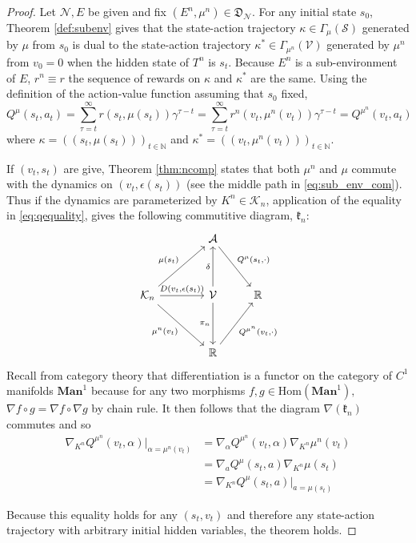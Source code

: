 \documentclass{article} %
\numberwithin{equation}{subsection}
\numberwithin{theorem}{subsection}
\theoremstyle{named}
\def\scriptv{{\mathcal V}}
\def\scripta{{\mathcal A}}
\def\scriptn{{\mathcal N}}
\def\scriptk{{\mathcal K}}
\def\scripts{{\mathcal S}}
\begin{document}
\begin{proof}
  Let $\scriptn, E$ be given and fix $(E^n, \mu^n) \in \mathfrak{D}_\scriptn$.
  For any initial state $s_0$, Theorem  \ref{def:subenv} gives that the state-action trajectory $\kappa \in \Gamma_\mu(\scripts)$ generated by $\mu$ from $s_0$ is dual to the state-action trajectory $\kappa^* \in \Gamma_{\mu^n}(\scriptv)$ generated by $\mu^n$ from $v_0 = 0$ when the hidden state of $T^n$ is $s_t$. Because $E^n$ is a sub-environment of $E$, $r^n \equiv r$ the sequence of rewards on $\kappa$ and $\kappa^*$ are the same. Using the definition of the action-value function assuming that $s_0$ fixed, 
  \begin{equation}\label{eq:qequality}
      Q^{\mu}(s_t, a_t) = \sum_{\tau =t}^\infty r(s_t, \mu(s_t)) \gamma^{\tau - t} = \sum_{\tau =t}^\infty r^n(v_t, \mu^n(v_t)) \gamma^{\tau - t} = Q^{\mu^n}(v_t, a_t)
  \end{equation}
  where $\kappa = ((s_t, \mu(s_t)))_{t\in\mathbb{N}}$ and $\kappa^* = ((v_t,\mu^n(v_t)))_{t\in\mathbb{N}}.$ 


  
If $(v_t, s_t)$ are give, Theorem \ref{thm:ncomp} states that both $\mu^n$ and $\mu$ commute with the dynamics on $(v_t, \epsilon(s_t))$ (see the middle path in \eqref{eq:sub_env_com}). Thus if the dynamics are parameterized by $K^n \in \scriptk_n$, application of the equality in \eqref{eq:qequality}, gives the following commutitive diagram, $\mathfrak{k}_n$:
  \begin{equation}\label{eq:kparam}
    \begin{tikzcd}
    &[+15pt] \scripta \arrow{rd}{Q^{\mu}(s_t, \cdot)}\\[+18pt]
      \scriptk_n \arrow{r}{D(v_t, \epsilon(s_t))}
            \arrow{rd}[swap]{\mu^n(v_t)} 
            \arrow{ru}{\mu(s_t)} & \scriptv \arrow{d}[swap]{\pi_n}\arrow{u}{\delta} & \mathbb{R}\\[+18pt]
      & \mathbb{R} \arrow{ru}[swap]{Q^{\mu^n}(v_t, \cdot)}
    \end{tikzcd}
  \end{equation}
  Recall from category theory that differentiation is a functor on the category of $C^1$ manifolds $\mathrm{\textbf{Man}}^1$ because for any two
  morphisms $f,g \in \mathrm{Hom}(\mathrm{\textbf{Man}}^1),$ $\nabla f \circ g = \nabla f \circ \nabla g$ by chain rule. It then follows that the diagram $\nabla(\mathfrak{k}_n)$ commutes and so
  \begin{equation*}
  \begin{aligned}
    \nabla_{K^n} Q^{\mu^n}(v_t, \alpha) \Big|_{\alpha=\mu^n(v_t)}
    &= \nabla_\alpha Q^{\mu^n}(v_t, \alpha) \nabla_{K^n} \mu^n(v_t) \\
    &=\nabla_a Q^{\mu}(s_t, a) \nabla_{K^n} \mu(s_t) \\
    &=\nabla_{K^n} Q^\mu(s_t, a) \Big|_{a = \mu(s_t)}
  \end{aligned}
  \end{equation*}
  
  Because this equality holds for any $(s_t, v_t)$ and therefore any state-action trajectory with arbitrary initial hidden variables, the theorem holds.
\end{proof}
\end{document}
